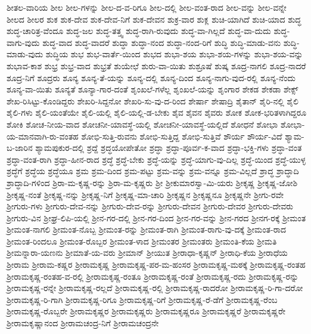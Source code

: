 {ಶೀತಲ-ವಾರಿಯ
ಶೀಲ
ಶೀಲ-ಗಳನ್ನು
ಶೀಲ-ದ-ವ-ರಿಗೂ
ಶೀಲ-ದಲ್ಲಿ
ಶೀಲ-ವಂತ-ರಾದ
ಶೀಲ-ವನ್ನು
ಶೀಲ-ವನ್ನೇ
ಶೀಲದ
ಶೀಲರ
ಶುಕ
ಶುಕ-ದೇವ
ಶುಕ-ದೇವ-ನಿಗೆ
ಶುಕ-ದೇವನ
ಶುಕ್ರ-ವಾರ
ಶುಕ್ಲ
ಶುಚಿ-ಯಾಗಿದೆ
ಶುಚಿ-ಯಾದ
ಶುದ್ಧ
ಶುದ್ಧ-ಚಾರಿತ್ರ-ವೆಂದೂ
ಶುದ್ಧ-ಜಲ
ಶುದ್ಧ-ತತ್ತ್ವ
ಶುದ್ಧ-ರಾಗಿ-ರುವುದು
ಶುದ್ಧ-ವಾ-ಗಿಲ್ಲದೆ
ಶುದ್ಧ-ವಾ-ದುದು
ಶುದ್ಧ-ವಾಗು-ವುದು
ಶುದ್ಧ-ವಾದ
ಶುದ್ಧ-ವಾದರೆ
ಶುದ್ಧಾ
ಶುದ್ಧಾ-ನಂದ
ಶುದ್ಧಾ-ನಂದ-ರಿಗೆ
ಶುದ್ಧಿ
ಶುದ್ಧಿ-ಮಾಡು-ವನು
ಶುದ್ಧಿ-ಮಾಡು-ವುದು
ಶುದ್ಧಿಯ
ಶುಭ
ಶುಭ-ವಾರ್ತೆ-ಯಿಂದ
ಶುಭದ
ಶುಭಾ-ಶಯ
ಶುಭಾ-ಶಯ-ಗಳನ್ನು
ಶುಭಾ-ಶಯ-ವನ್ನು
ಶುಭಾವ-ಕಾಶ
ಶುಭ್ರ
ಶುಭ್ರ-ವಾದ
ಶುಭ್ರತೆ
ಶುಯೇಛೆ
ಶುರು-ವಾ-ಯಿತು
ಶುಶ್ರೂಷೆ
ಶುಷ್ಕ
ಶೂದ್ರ-ನಾಗಲಿ
ಶೂದ್ರ-ನಾದರೆ
ಶೂದ್ರ-ನಿಗೆ
ಶೂದ್ರರು
ಶೂನ್ಯ
ಶೂನ್ಯ-ತೆ-ಯನ್ನು
ಶೂನ್ಯ-ದಲ್ಲಿ
ಶೂನ್ಯ-ದಿಂದ
ಶೂನ್ಯ-ನಾಗು-ವುದ-ರಲ್ಲಿ
ಶೂನ್ಯ-ನೆಂದು
ಶೂನ್ಯ-ವಾ-ಯಿತು
ಶೂನ್ಯತೆ
ಶೂನ್ಯಾ-ಗಾರ-ದಂತೆ
ಶೃಂಖಲೆ-ಗಳೆಲ್ಲ
ಶೃಂಖಲೆ-ಯನ್ನು
ಶೃಂಗಾರ
ಶೇಕಡ
ಶೇಕಡಾ
ಶೇಕ್ಸ್
ಶೇಖ-ರಿಸಿಟ್ಟು-ಕೊಂಡಿದ್ದರು
ಶೇಖರಿ-ಸಿದ್ದನೋ
ಶೇಖರಿ-ಸು-ವು-ದ-ರಿಂದ
ಶೇರ್ಷಾ
ಶೇಷಾದ್ರಿ
ಶೈತಾನ್
ಶೈರಿ-ನಲ್ಲಿ
ಶೈಲಿ
ಶೈಲಿ-ಗಳು
ಶೈಲಿ-ಯಂತೆಯೇ
ಶೈಲಿ-ಯಲ್ಲಿ
ಶೈಲಿ-ಯಲ್ಲಿ-ಡ-ಬೇಕು
ಶೈವ
ಶೈವನ
ಶೈವರು
ಶೋಕ
ಶೋಕ-ಭರಿತಳಾಗಿದ್ದರೂ
ಶೋಕಿ
ಶೋಚ-ನೀಯ-ವಾದ
ಶೋಚನೀ-ಯಾವಸ್ಥೆ-ಯಲ್ಲಿ
ಶೋಚನೀ-ಯಾವಸ್ಥೆ-ಯಲ್ಲಿದೆ
ಶೋಧನೆ
ಶೋಭಾ
ಶೋಭಾ-ಯ-ಮಾನವಾಗಿ-ರು-ವಂತಹ
ಶೋಭಿ-ಸುತ್ತಿ-ರುವನು
ಶೋಭಿ-ಸುತ್ತಿದ್ದ
ಶೋಭಿ-ಸುತ್ತಿವೆ
ಶೌರ್ಯ
ಶೌರ್ಯ-ವಿದೆ
ಶ್ಯಾಮ-ಬ-ಜಾರಿನ
ಶ್ಯಾಮಪುಕುರ-ದಲ್ಲಿ
ಶ್ರದ್ದೆ
ಶ್ರದ್ಧಯೋಪೇತೋ
ಶ್ರದ್ಧಾ
ಶ್ರದ್ಧಾ-ಪೂರ್ವ-ಕ-ವಾದ
ಶ್ರದ್ಧಾ-ಭಕ್ತಿ-ಗಳು
ಶ್ರದ್ಧಾ-ವಂತ
ಶ್ರದ್ಧಾ-ವಂತ-ರಾಗಿ
ಶ್ರದ್ಧಾ-ಹೀನ-ರಾದ
ಶ್ರದ್ಧೆ
ಶ್ರದ್ಧೆ-ಬೇಕು
ಶ್ರದ್ಧೆ-ಯನ್ನು
ಶ್ರದ್ಧೆ-ಯಾಗು-ವು-ದಿಲ್ಲ
ಶ್ರದ್ಧೆ-ಯಿಂದ
ಶ್ರದ್ಧೆ-ಯುಳ್ಳ
ಶ್ರದ್ಧೆಗೆ
ಶ್ರದ್ಧೆಯ
ಶ್ರದ್ಧೆಯೂ
ಶ್ರಮ
ಶ್ರಮ-ದಿಂದ
ಶ್ರಮ-ಪಟ್ಟು
ಶ್ರಮ-ವನ್ನು
ಶ್ರಮ-ವನ್ನೂ
ಶ್ರಮ-ವಿಲ್ಲದೆ
ಶ್ರಾದ್ಧ
ಶ್ರಾದ್ಧಾದಿ
ಶ್ರಾದ್ಧಾದಿ-ಗಳಿಂದ
ಶ್ರಿರಾ-ಮ-ಕೃಷ್ಣ-ರನ್ನು
ಶ್ರಿರಾ-ಮ-ಕೃಷ್ಣರು
ಶ್ರೀ
ಶ್ರೀಕುಮಾರಸ್ವಾ-ಮಿ-ಯರು
ಶ್ರೀಕೃಷ್ಣ
ಶ್ರೀಕೃಷ್ಣ-ಜೋಶಿ
ಶ್ರೀಕೃಷ್ಣ-ನಂತೆ
ಶ್ರೀಕೃಷ್ಣ-ನನ್ನು
ಶ್ರೀಕೃಷ್ಣ-ನಿಗೆ
ಶ್ರೀಕೃಷ್ಣ-ಮಾ-ಚಾರಿ
ಶ್ರೀಕೃಷ್ಣನ
ಶ್ರೀಕೃಷ್ಣನೂ
ಶ್ರೀಕೃಷ್ಣನೇ
ಶ್ರೀಗು-ರವೇ
ಶ್ರೀಗುರು-ಗಳು
ಶ್ರೀಗುರು-ದೇವ-ನನ್ನು
ಶ್ರೀಗುರು-ದೇವ-ರನ್ನು
ಶ್ರೀಗುರು-ದೇವನ
ಶ್ರೀಗುರು-ದೇವರ
ಶ್ರೀಗುರು-ದೇವರು
ಶ್ರೀಗುರು-ವಿನ
ಶ್ರೀಘ್ರ-ಲಿಪಿ-ಯಲ್ಲಿ
ಶ್ರೀನ-ಗರ-ದಲ್ಲಿ
ಶ್ರೀನ-ಗರ-ದಿಂದ
ಶ್ರೀನ-ಗರ-ವನ್ನು
ಶ್ರೀನ-ಗರದ
ಶ್ರೀನಗ-ರಕ್ಕೆ
ಶ್ರೀಮಂತ
ಶ್ರೀಮಂತ-ನಾಗಲಿ
ಶ್ರೀಮಂತ-ನೊಬ್ಬ
ಶ್ರೀಮಂತ-ರನ್ನು
ಶ್ರೀಮಂತ-ರಾಗಿ
ಶ್ರೀಮಂತ-ರಾಗು-ವು-ದಕ್ಕೆ
ಶ್ರೀಮಂತ-ರಾದ
ಶ್ರೀಮಂತ-ರಿಂದಲೂ
ಶ್ರೀಮಂತ-ರೊಬ್ಬರ
ಶ್ರೀಮಂತ-ಳಾದ
ಶ್ರೀಮಂತರ
ಶ್ರೀಮಂತರು
ಶ್ರೀಮಂತಿ-ಕೆಯ
ಶ್ರೀಮತಿ
ಶ್ರೀಮನ್ನಾರಾ-ಯಣನು
ಶ್ರೀಮಾತೆ-ಯ-ವರು
ಶ್ರೀಮಾನ್
ಶ್ರೀಯುತ
ಶ್ರೀರಾಧಾ-ಕೃಷ್ಣನ್
ಶ್ರೀರಾಧಿ-ಕೆಯ
ಶ್ರೀರಾಧೆಯ
ಶ್ರೀರಾಮ
ಶ್ರೀರಾಮ-ಕಷ್ಣರ
ಶ್ರೀರಾಮಕೃಷ್ಣ
ಶ್ರೀರಾಮಕೃಷ್ಣ-ಪರ-ಮ-ಹಂಸರ
ಶ್ರೀರಾಮಕೃಷ್ಣ-ಮಠಕ್ಕೆ
ಶ್ರೀರಾಮಕೃಷ್ಣ-ರಂತಹ
ಶ್ರೀರಾಮಕೃಷ್ಣ-ರಂತಹ-ವ-ರಲ್ಲಿ
ಶ್ರೀರಾಮಕೃಷ್ಣ-ರಂತೂ
ಶ್ರೀರಾಮಕೃಷ್ಣ-ರಂತೆ
ಶ್ರೀರಾಮಕೃಷ್ಣ-ರದು
ಶ್ರೀರಾಮಕೃಷ್ಣ-ರನ್ನು
ಶ್ರೀರಾಮಕೃಷ್ಣ-ರನ್ನೇ
ಶ್ರೀರಾಮಕೃಷ್ಣ-ರಲ್ಲದೆ
ಶ್ರೀರಾಮಕೃಷ್ಣ-ರಲ್ಲಿ
ಶ್ರೀರಾಮಕೃಷ್ಣ-ರಾದರೋ
ಶ್ರೀರಾಮಕೃಷ್ಣ-ರಿ-ಗಾ-ದರೋ
ಶ್ರೀರಾಮಕೃಷ್ಣ-ರಿ-ಗಾಗಿ
ಶ್ರೀರಾಮಕೃಷ್ಣ-ರಿಗೂ
ಶ್ರೀರಾಮಕೃಷ್ಣ-ರಿಗೆ
ಶ್ರೀರಾಮಕೃಷ್ಣ-ರೆ-ಡೆಗೆ
ಶ್ರೀರಾಮಕೃಷ್ಣ-ರೆಂಬ
ಶ್ರೀರಾಮಕೃಷ್ಣ-ರೊಬ್ಬರೇ
ಶ್ರೀರಾಮಕೃಷ್ಣರ
ಶ್ರೀರಾಮಕೃಷ್ಣರು
ಶ್ರೀರಾಮಕೃಷ್ಣರೂ
ಶ್ರೀರಾಮಕೃಷ್ಣರೆ
ಶ್ರೀರಾಮಕೃಷ್ಣರೇ
ಶ್ರೀರಾಮಕೃಷ್ಣಾನಂದ
ಶ್ರೀರಾಮಚಂದ್ರ-ನಿಗೆ
ಶ್ರೀರಾಮಚಂದ್ರನೇ
}
